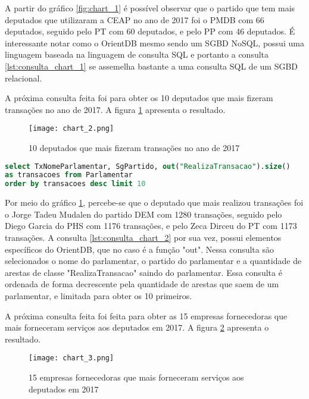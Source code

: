 A partir do gráfico \ref{fig:chart_1} é possível observar que o partido que tem mais deputados que utilizaram a CEAP no ano de 2017 foi o PMDB com 66 deputados, seguido pelo PT com 60 deputados, e pelo PP com 46 deputados. É interessante notar como o OrientDB mesmo sendo um SGBD NoSQL, possui uma linguagem baseada na linguagem de consulta SQL e portanto a consulta \ref{lst:consulta_chart_1} se assemelha bastante a uma consulta SQL de um SGBD relacional.

A próxima consulta feita foi para obter os 10 deputados que mais fizeram transações no ano de 2017. A figura \ref{fig:chart_2} apresenta o resultado.

\begin{figure}[H]
\centering
\texttt{[image: chart\_2.png]}
\caption{10 deputados que mais fizeram transações no ano de 2017}
\label{fig:chart_2}
\end{figure}

\begin{lstlisting}[label={lst:consulta_chart_2}, caption={Consulta para o gráfico \ref{fig:chart_2}},captionpos=b, language=sql]
select TxNomeParlamentar, SgPartido, out("RealizaTransacao").size() 
as transacoes from Parlamentar 
order by transacoes desc limit 10
\end{lstlisting}

Por meio do gráfico \ref{fig:chart_2}, percebe-se que o deputado que mais realizou transações foi o Jorge Tadeu Mudalen do partido DEM com 1280 transações, seguido pelo Diego Garcia do PHS com 1176 transações, e pelo Zeca Dirceu do PT com 1173 transações. A consulta \ref{lst:consulta_chart_2} por sua vez, possui elementos específicos do OrientDB, que no caso é a função "out". Nessa consulta são selecionados o nome do parlamentar, o partido do parlamentar e a quantidade de arestas de classe "RealizaTransacao" saindo do parlamentar. Essa consulta é ordenada de forma decrescente pela quantidade de arestas que saem de um parlamentar, e limitada para obter os 10 primeiros.

A próxima consulta feita foi feita para obter as 15 empresas fornecedoras que mais forneceram serviços aos deputados em 2017. A figura \ref{fig:chart_3} apresenta o resultado.

\begin{figure}[H]
\centering
\texttt{[image: chart\_3.png]}
\caption{15 empresas fornecedoras que mais forneceram serviços aos deputados em 2017}
\label{fig:chart_3}
\end{figure}

